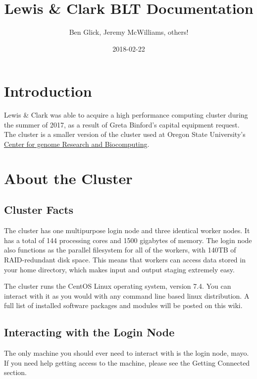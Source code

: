 \documentclass[]{book}
\title{Lewis \& Clark BLT Documentation}
\author{Ben Glick, Jeremy McWilliams, others!}
\date{2018-02-22}
\theoremstyle{definition}
\theoremstyle{definition}
\theoremstyle{definition}
\theoremstyle{remark}
\begin{document}
\maketitle

{
\setcounter{tocdepth}{1}
\tableofcontents
}
\chapter*{Introduction}\label{introduction}

Lewis \& Clark was able to acquire a high performance computing cluster
during the summer of 2017, as a result of Greta Binford's capital
equipment request. The cluster is a smaller version of the cluster used
at Oregon State University's \href{http://cgrb.oregonstate.edu/}{Center
for genome Research and Biocomputing}.

\chapter{About the Cluster}\label{about-the-cluster}

\section{Cluster Facts}\label{cluster-facts}

The cluster has one multipurpose login node and three identical worker
nodes. It has a total of 144 processing cores and 1500 gigabytes of
memory. The login node also functions as the parallel filesystem for all
of the workers, with 140TB of RAID-redundant disk space. This means that
workers can access data stored in your home directory, which makes input
and output staging extremely easy.

The cluster runs the CentOS Linux operating system, version 7.4. You can
interact with it as you would with any command line based linux
distribution. A full list of installed software packages and modules
will be posted on this wiki.

\section{Interacting with the Login
Node}\label{interacting-with-the-login-node}

The only machine you should ever need to interact with is the login
node, mayo. If you need help getting access to the machine, please see
the Getting Connected section.
\end{document}
